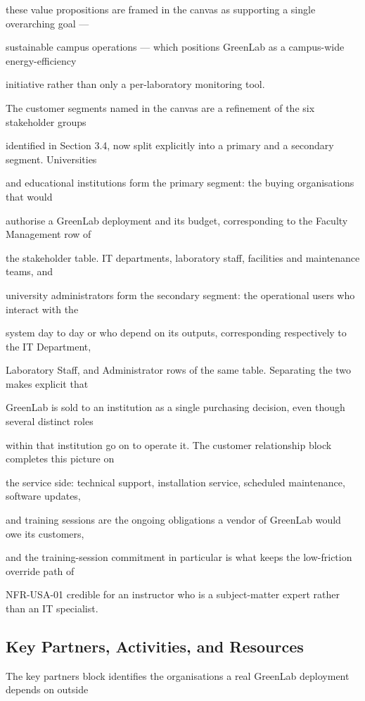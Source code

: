 these value propositions are framed in the canvas as supporting a single overarching goal ---

sustainable campus operations --- which positions GreenLab as a campus-wide energy-efficiency

initiative rather than only a per-laboratory monitoring tool.

The customer segments named in the canvas are a refinement of the six stakeholder groups

identified in Section 3.4, now split explicitly into a primary and a secondary segment. Universities

and educational institutions form the primary segment: the buying organisations that would

authorise a GreenLab deployment and its budget, corresponding to the Faculty Management row of

the stakeholder table. IT departments, laboratory staff, facilities and maintenance teams, and

university administrators form the secondary segment: the operational users who interact with the

system day to day or who depend on its outputs, corresponding respectively to the IT Department,

Laboratory Staff, and Administrator rows of the same table. Separating the two makes explicit that

GreenLab is sold to an institution as a single purchasing decision, even though several distinct roles

within that institution go on to operate it. The customer relationship block completes this picture on

the service side: technical support, installation service, scheduled maintenance, software updates,

and training sessions are the ongoing obligations a vendor of GreenLab would owe its customers,

and the training-session commitment in particular is what keeps the low-friction override path of

NFR-USA-01 credible for an instructor who is a subject-matter expert rather than an IT specialist.


\subsection{Key Partners, Activities, and Resources}
The key partners block identifies the organisations a real GreenLab deployment depends on outside

